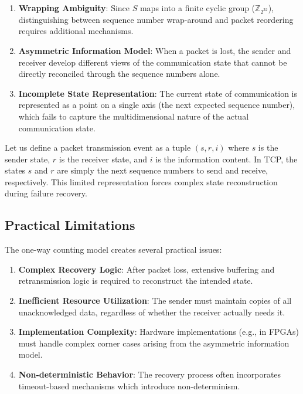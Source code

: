 \documentclass[../../../OAE-SPEC-MAIN.tex]{subfiles}
\begin{document}
\begin{enumerate}
    \item \textbf{Wrapping Ambiguity}: Since $S$ maps into a finite cyclic group ($\mathbb{Z}_{2^{32}}$), distinguishing between sequence number wrap-around and packet reordering requires additional mechanisms.
    
    \item \textbf{Asymmetric Information Model}: When a packet is lost, the sender and receiver develop different views of the communication state that cannot be directly reconciled through the sequence numbers alone.
    
    \item \textbf{Incomplete State Representation}: The current state of communication is represented as a point on a single axis (the next expected sequence number), which fails to capture the multidimensional nature of the actual communication state.
\end{enumerate}

Let us define a packet transmission event as a tuple $(s, r, i)$ where $s$ is the sender state, $r$ is the receiver state, and $i$ is the information content. In TCP, the states $s$ and $r$ are simply the next sequence numbers to send and receive, respectively. This limited representation forces complex state reconstruction during failure recovery.

\subsection{Practical Limitations}

The one-way counting model creates several practical issues:

\begin{enumerate}
    \item \textbf{Complex Recovery Logic}: After packet loss, extensive buffering and retransmission logic is required to reconstruct the intended state.
    
    \item \textbf{Inefficient Resource Utilization}: The sender must maintain copies of all unacknowledged data, regardless of whether the receiver actually needs it.
    
    \item \textbf{Implementation Complexity}: Hardware implementations (e.g., in FPGAs) must handle complex corner cases arising from the asymmetric information model.
    
    \item \textbf{Non-deterministic Behavior}: The recovery process often incorporates timeout-based mechanisms which introduce non-determinism.
\end{enumerate}
\end{document}
